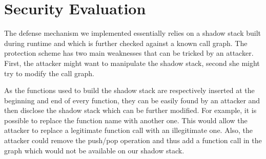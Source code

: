 \documentclass{llncs}
\begin{document}
\begin{table}
  \centering {}
  \caption{Protection time for different programs}
  \label{table:protectionTime}
\end{table}

\section{Security Evaluation}
The defense mechanism we implemented essentially relies on a shadow stack built during runtime and which is further checked against a known call graph. The protection scheme has two main weaknesses that can be tricked by an attacker. First, the attacker might want to manipulate the shadow stack, second she might try to modify the call graph.

As the functions used to build the shadow stack are respectively inserted at the beginning and end of every function, they can be easily found by an attacker and then disclose the shadow stack which can be further modified. For example, it is possible to replace the function name with another one. This would allow the attacker to replace a legitimate function call with an illegitimate one. Also, the attacker could remove the push/pop operation and thus add a function call in the graph which would not be available on our shadow stack.
\end{document}
